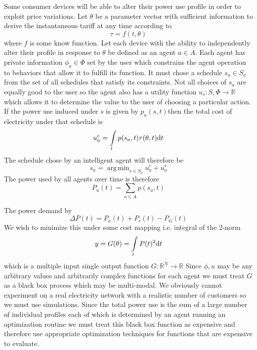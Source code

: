 \documentclass[11pt]{article}
\DeclareMathOperator*{\argmin}{arg\,min}
\begin{document}
Some consumer devices will be able to alter their power use profile in order to
exploit price variations. Let $\theta$ be a parameter vector with sufficient information
to derive the instantaneous tariff at any time according to
\begin{equation}
\tau = f(t, \theta)
\end{equation}
where $f$ is some know function. Let each device with the ability to independently alter their profile in response to $\theta$ be defined as an agent $a \in A$.
Each agent has private information $\phi_{a} \in \Phi $ set by the user which constrains the
agent operation to behaviors that allow it to fulfill its function. It must chose a
schedule $s_{a} \in S_{a}$ from the set of all schedules that satisfy its constraints. Not all
choices of $s_{a}$ are equally good to the user so the agent also has a utility function
$u_{s} : S, \Phi \rightarrow \mathbb{R} $ which allows it to determine the value to the user of choosing a
particular action. If the power use induced under $s$ is given by $ p_{a} (s, t) $then the total cost of
electricity under that schedule is
\begin{equation}
u_{a}^{e} = \intop_{t} p(s_{a}, t) \tau(\theta, t) \mathrm{d}t
\end{equation}
The schedule chose by an intelligent agent will therefore be
\begin{equation}
s_{a} = \argmin _{s \in S_{a}} u_{a}^{e} + u_{a}^{s}
\end{equation}
The power used by all agents over time is therefore
\begin{equation}
P_{a}(t) = \sum_{a \in A} p (s_{a} , t)
\end{equation}

The power demand
by
\begin{equation}
\Delta P (t) = P_{a} (t) + P_{c} (t) - P_{G} (t)
\end{equation}
We wish to minimize this under some cost mapping i.e. integral of the 2-norm
\begin{equation}
y = G(\theta) = \intop_{t} P (t)^{2} \mathrm{d}t
\end{equation}
which is a multiple input single output function $G : \mathbb{R}^{N} \rightarrow \mathbb{R}$
Since $\phi, u$ may be any arbitrary values and arbitrarily complex functions for
each agent we must treat $G$ as a black box process which may be multi-modal.
We obviously cannot experiment on a real electricity network with a realistic
number of customers so we must use simulations. Since the total power use is
the sum of a large number of individual profiles each of which is determined by
an agent running an optimization routine we must treat this black box function
as expensive and therefore use appropriate optimization techniques for functions
that are expensive to evaluate.
\end{document}
